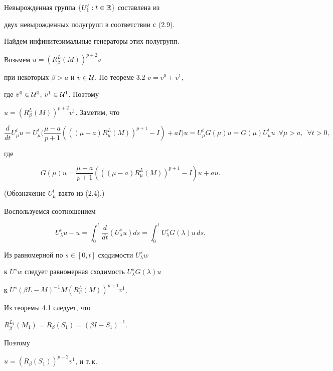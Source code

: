 \begin{pf}


Невырожденная группа $\{ U^t_1:t \in {\Bbb R}\}$ составлена из


двух невырожденных полугрупп в соответствии с (2.9).


Найдем инфинитезимальные генераторы этих полугрупп.


Возьмем $u=(R_{\beta }^L(M))^{p+2}v$


при некоторых $\beta >a$ и $v\in {\cal U}$. По теореме 3.2\; $v=v^0+v^1$,


где $v^0\in {\cal U}^0$, $v^1\in {\cal U}^1$. Поэтому


$u=(R_{\beta }^L(M))^{p+2}v^1$. Заметим, что


$$


\frac {d}{dt}U_{\mu }^tu=U_{\mu }^t\bigg(\frac {\mu-a}{p+1}(((\mu-a)


R_{\mu }^L(M))^{p+1}-I)+aI\bigg)u=


U_{\mu }^tG(\mu )u=G(\mu )U_{\mu }^tu\ \; \forall \mu >a,\ \;\forall t>0,


$$


где


$$


G(\mu )u=\frac{\mu-a}{p+1}(((\mu-a) R_{\mu }^L(M))^{p+1}-I)u+au.


$$


(Обозначение $U^t_{\mu}$ взято из (2.4).)


Воспользуемся соотношением


\begin{equation}


U_{\lambda }^tu-u=\int_0^t\frac{d}{dt}(U_{\lambda }^su)ds=


\int_0^tU_{\lambda }^sG(\lambda )u\,ds.


\end{equation}


Из равномерной по $s\in [0,t]$ сходимости $U_{\lambda }^sw$


к $U^sw$ следует равномерная сходимость $U_{\lambda }^sG(\lambda )u$


к $U^s(\beta L-M)^{-1}M(R_{\beta}^L(M))^{p+1}v^1$.





Из теоремы 4.1 следует, что


$R_{\beta }^{L_1}(M_1)=R_{\beta }(S_1)=(\beta I-S_1)^{-1}$.


Поэтому


$u=(R_{\beta }(S_1))^{p+2}v^1$, и т.\,к.



\end{pf}
